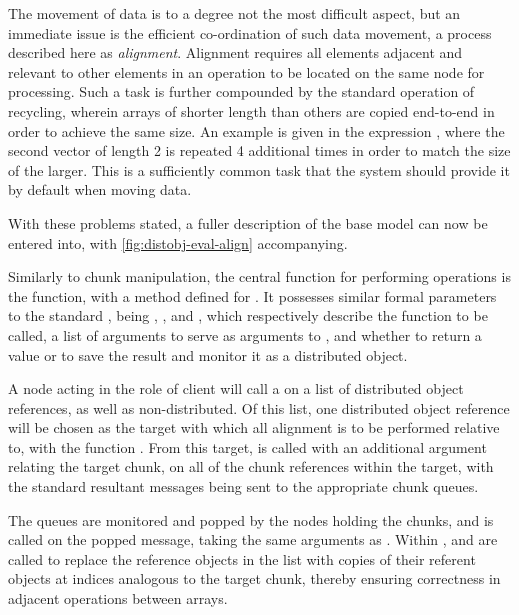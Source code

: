 The movement of data is to a degree not the most difficult aspect, but an
immediate issue is the efficient co-ordination of such data movement, a process
described here as \textit{alignment}.
Alignment requires all elements adjacent and relevant to other elements in an
operation to be located on the same node for processing.
Such a task is further compounded by the standard operation of recycling,
wherein arrays of shorter length than others are copied end-to-end in order to
achieve the same size.
An example is given in the expression , where
the second vector of length 2 is repeated 4 additional times in order to match
the size of the larger.
This is a sufficiently common task that the system should provide it by default
when moving data.

With these problems stated, a fuller description of the base model can now be
entered into, with \cref{fig:distobj-eval-align} accompanying.


Similarly to chunk manipulation, the central function for performing operations
is the  function, with a method defined for
. It possesses similar formal parameters to the standard
, being , , and
, which respectively describe the function to be called, a list
of arguments to serve as arguments to , and whether to return a
value or to save the result and monitor it as a distributed object.

A node acting in the role of client will call a
 on a list of distributed object
references, as well as non-distributed.
Of this list, one distributed object reference will be chosen as the target
with which all alignment is to be performed relative to, with the function
.
From this target,  is called with an
additional  argument relating the target chunk, on all of the
chunk references within the target, with the standard resultant messages being
sent to the appropriate chunk queues.

The queues are monitored and popped by the nodes holding the chunks, and
 is called on the popped message, taking the
same arguments as .
Within , 
and  are called to replace the reference
objects in the  list with copies of their referent objects at
indices analogous to the target chunk, thereby ensuring correctness in
adjacent operations between arrays.

